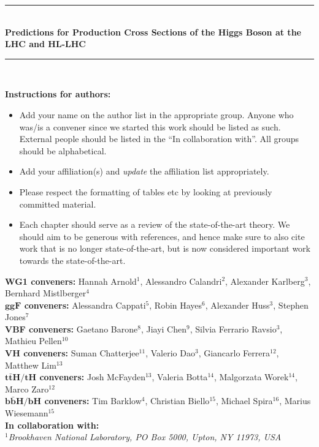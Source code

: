 \documentclass[11pt]{article}
\newcommand{\HRule}{\rule{\linewidth}{0.5mm}}
\begin{document}
\begin{titlepage}
\begin{center}
    \HRule \\[0.9cm]
    \textbf{\Large Predictions for Production Cross Sections of the Higgs Boson at the LHC and HL-LHC} \\[1.0cm]
    \HRule \\[1.5cm]
           {\color{blue} {\bf Instructions for authors:} \begin{itemize} \item Add your name on the author list in the appropriate group. Anyone who was/is a convener since we started this work should be listed as such. External people should be listed in the ``In collaboration with''. All groups should be alphabetical. \item Add your affiliation(s) and \emph{update} the affiliation list appropriately. \item Please respect the formatting of tables etc by looking at previously committed material. \item Each chapter should serve as a review of the state-of-the-art theory. We should aim to be generous with references, and hence make sure to also cite work that is no longer state-of-the-art, but is now considered important work towards the state-of-the-art. \end{itemize}}
	   \textrm{
             {\large {\bf WG1 conveners:} Hannah Arnold$^{1}$, Alessandro Calandri$^{2}$, Alexander Karlberg$^{3}$, Bernhard Mistlberger$^{4}$\\
               {\bf $\boldsymbol{ggF}$ conveners:}  Alessandra Cappati$^{5}$, Robin Hayes$^{6}$, Alexander Huss$^{3}$, Stephen Jones$^{7}$\\
               {\bf VBF conveners:} Gaetano Barone$^{8}$, Jiayi Chen$^{9}$, Silvia Ferrario Ravsio$^{3}$, Mathieu Pellen$^{10}$\\
               {\bf $\boldsymbol{VH}$ conveners:} Suman Chatterjee$^{11}$, Valerio Dao$^{3}$, Giancarlo Ferrera$^{12}$, Matthew Lim$^{13}$\\
               {\bf $\boldsymbol{t\bar{t}H/tH}$ conveners:} Josh McFayden$^{13}$, Valeria Botta$^{14}$, Malgorzata Worek$^{14}$, Marco Zaro$^{12}$\\
               {\bf $\boldsymbol{b\bar{b}H/bH}$ conveners:} Tim Barklow$^{4}$, Christian Biello$^{15}$, Michael Spira$^{16}$, Marius Wiesemann$^{15}$\\
               {\bf In collaboration with:} 
           }} \\[0.3cm]	
           \textit{$^{1}$Brookhaven National Laboratory, PO Box 5000, Upton, NY 11973, USA}\\   

\end{center}
\end{titlepage}
\end{document}
